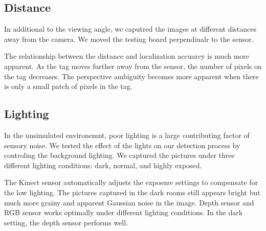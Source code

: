 \subsection{Distance}
In additional to the viewing angle, we caputred the images at different distances away from the camera. We moved the testing board perpendiualr to the sensor. 

The relationship between the distance and localization accuarcy is much more apparent. As the tag moves further away from the sensor, the number of pixels on the tag decreases. The perspective ambiguity becomes more apparent when there is only a small patch of pixels in the tag. 
\subsection{Lighting}
In the unsimulated environemnt, poor lighting is a large contributing factor of sensory noise. We tested the effect of the lights on our detection process by controling the background lighting. We captured the pictures under three different lighting conditions: dark, normal, and highly exposed. 

The Kinect sensor automatically adjusts the exposure settings to compensate for the low lighting. The pictures captured in the dark rooms still appears bright but much more grainy and apparent Gaussian noise in the image. Depth sensor and RGB sensor works optimally under different lighting conditions. In the dark setting, the depth sensor performs well. 



